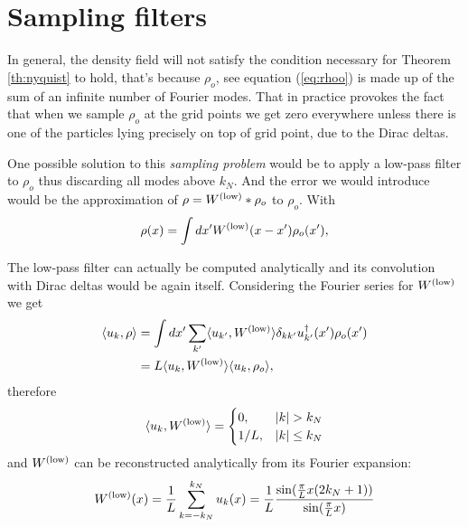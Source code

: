 \section{Sampling filters}\label{sec:sampling}

\noindent In general, the density field will not satisfy 
the condition necessary for Theorem \ref{th:nyquist} to hold,
that's because $\rho_o$, see equation (\ref{eq:rhoo}) is
made up of the sum of an infinite number of Fourier modes.
That in practice provokes the fact that when we sample
$\rho_o$ at the grid points we get zero everywhere unless
there is one of the particles lying precisely on top of grid
point, due to the Dirac deltas.

One possible solution to this \emph{sampling problem}
would be to apply a low-pass filter to $\rho_o$
thus discarding all modes above $k_N$.
And the error we would introduce would be the approximation of
$\rho = W^\mathrm{(low)} * \rho_o$ to $\rho_o$. 
With
\begin{equation}
    \rho(x) = \int dx' W^\mathrm{(low)}(x-x') \rho_o(x'),
    \label{eq:sample1}
\end{equation}


The low-pass filter can actually be computed analytically
and its convolution with Dirac deltas would be again itself.
Considering the Fourier series for $W^\mathrm{(low)}$ we get 
\begin{align}
\begin{split}
    \langle u_k, \rho\rangle
    &= \int dx' \sum_{k'} \langle u_{k'},W^\mathrm{(low)} \rangle \delta_{kk'}   u_{k'}^{\dagger}(x') \rho_o(x') \\
    &= L \langle u_{k},W^\mathrm{(low)} \rangle \langle u_{k}, \rho_o \rangle ,
    \label{eq:sample2}
\end{split}
\end{align}
therefore
\begin{equation}
\langle u_{k},\Wlow \rangle = 
    \begin{cases}
    0, & |k|>k_N\\
    1/L, & |k|\le k_N
    \end{cases}
\end{equation}
and $W^\mathrm{(low)}$ can be reconstructed analytically from its Fourier expansion:
\begin{equation}
 W^\mathrm{(low)}(x)
 = \frac{1}{L}\sum_{k=-k_N}^{k_N} u_k(x)
 = \frac{1}{L} \frac{  \sin(\frac{\pi}{L} x (2k_N +1))  }{\sin(\frac{\pi}{L}x)}
 \label{eq:wlow}
\end{equation}


